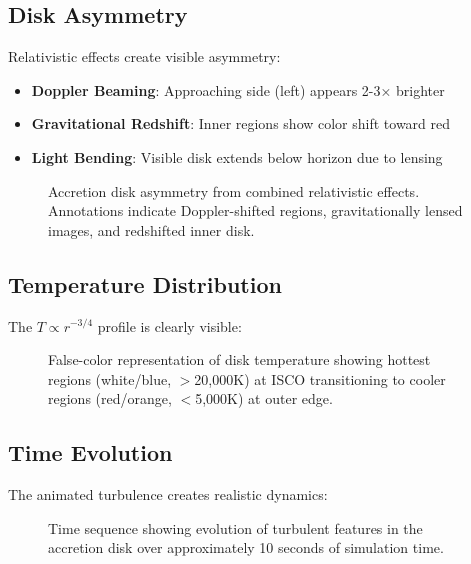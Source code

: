 \documentclass[12pt,a4paper]{article}
\theoremstyle{definition}
\theoremstyle{remark}
\begin{document}
\subsection{Disk Asymmetry}

Relativistic effects create visible asymmetry:

\begin{itemize}
    \item \textbf{Doppler Beaming}: Approaching side (left) appears 2-3× brighter
    \item \textbf{Gravitational Redshift}: Inner regions show color shift toward red
    \item \textbf{Light Bending}: Visible disk extends below horizon due to lensing
\end{itemize}

\begin{figure}[H]
    \centering
    \caption{Accretion disk asymmetry from combined relativistic effects. Annotations indicate Doppler-shifted regions, gravitationally lensed images, and redshifted inner disk.}
    \label{fig:disk_asymmetry}
\end{figure}

\subsection{Temperature Distribution}

The $T \propto r^{-3/4}$ profile is clearly visible:

\begin{figure}[H]
    \centering
    \caption{False-color representation of disk temperature showing hottest regions (white/blue, $>$20,000K) at ISCO transitioning to cooler regions (red/orange, $<$5,000K) at outer edge.}
    \label{fig:temperature_map}
\end{figure}

\subsection{Time Evolution}

The animated turbulence creates realistic dynamics:

\begin{figure}[H]
    \centering
    \caption{Time sequence showing evolution of turbulent features in the accretion disk over approximately 10 seconds of simulation time.}
    \label{fig:time_evolution}
\end{figure}
\end{document}
